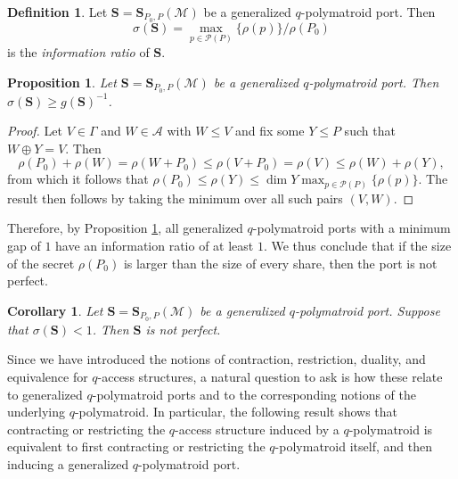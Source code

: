 \documentclass[onecolumn,draftclsnofoot,12pt]{IEEEtran}
\renewcommand{\S}{\mathbf{S}}
\newcommand{\M}{\mathcal{M}}
\theoremstyle{plain} %
\newtheorem{corollary}[theorem]{Corollary}
\newtheorem{proposition}[theorem]{Proposition}
\theoremstyle{definition}
\newtheorem{definition}[theorem]{Definition}
\begin{document}
\begin{definition}
    Let $\mathbf{S} = \mathbf{S}_{P_0,P}(\mathcal{M})$ be a generalized $q$-polymatroid port. Then $$\sigma(\mathbf{S}) = \max_{p \in \mathcal{P}(P)}\{ \rho(p)\}/\rho(P_0)$$ is the \emph{information ratio} of $\mathbf{S}$.
\end{definition}


\begin{proposition} \label{prop:gap}
Let $\mathbf{S} = \mathbf{S}_{P_0,P}(\mathcal{M})$ be a generalized $q$-polymatroid port. Then $\sigma(\mathbf{S})\geq g(\mathbf{S})^{-1}$.
\end{proposition}
\begin{proof}
Let $V\in \Gamma$ and $W\in \mathcal{A}$ with $W\leq V$ and fix some $Y\leq P$ such that $W\oplus Y = V$. Then
\[
    \rho(P_0) + \rho(W) = \rho(W+P_0) \leq \rho(V+P_0) = \rho(V) \leq \rho(W) + \rho(Y),
\]
from which it follows that $\rho(P_0)\leq \rho(Y) \leq \dim Y \max_{p\in \mathcal{P}(P)}\{\rho(p)\}$. The result then follows by taking the minimum over all such pairs $(V,W)$.
\end{proof}

Therefore, by Proposition \ref{prop:gap}, all generalized $q$-polymatroid ports with a minimum gap of $1$ have an information ratio of at least $1$. We thus conclude that if the size of the secret $\rho(P_0)$ is larger than the size of every share, then the port is not perfect.

\begin{corollary}
Let $\S=\S_{P_0,P}(\M)$ be a generalized $q$-polymatroid port. Suppose that $\sigma(\S) <1$. Then $\S$ is not perfect.
\end{corollary}



Since we have introduced the notions of contraction, restriction, duality, and equivalence for $q$-access structures, a natural question to ask is how these relate to generalized $q$-polymatroid ports and to the corresponding notions of the underlying $q$-polymatroid. In particular, the following result shows that contracting or restricting the $q$-access structure induced by a $q$-polymatroid is equivalent to first contracting or restricting the $q$-polymatroid itself, and then inducing a generalized $q$-polymatroid port.
\end{document}

